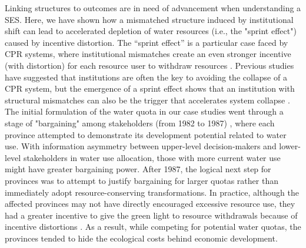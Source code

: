 Linking structures to outcomes are in need of advancement when understanding a SES.
Here, we have shown how a mismatched structure induced by institutional shift can lead to accelerated depletion of water resources (i.e., the "sprint effect") caused by incentive distortion. The ``sprint effect'' is a particular case faced by CPR systems, where institutional mismatches create an even stronger incentive (with distortion) for each resource user to withdraw resources
\cite{ostromRevisitingCommonsLocal1999,ostromGeneralFrameworkAnalyzing2009,castilla-rhoSocialtippingpoints2017}.
Previous studies have suggested that institutions are often the key to avoiding the collapse of a CPR system, but the emergence of a sprint effect shows that an institution with structural mismatches can also be the trigger that accelerates system collapse \cite{bodinConservationSuccessFunction2014,bodinCollaborativeenvironmentalgovernance2017,wangAlignmentsocialecological2019}.
The initial formulation of the water quota in our case studies went through a stage of "bargaining" among stakeholders (from 1982 to 1987) \cite{wangReviewImplementationYellow2019, wangThingsCurrentSignificance2019}, where each province attempted to demonstrate its development potential related to water use.
With information asymmetry between upper-level decision-makers and lower-level stakeholders in water use allocation, those with more current water use might have greater bargaining power. After 1987, the logical next step for provinces was to attempt to justify bargaining for larger quotas rather than immediately adopt resource-conserving transformations. In practice, although the affected provinces may not have directly encouraged excessive resource use, they had a greater incentive to give the green light to resource withdrawals because of incentive distortions \cite{kriegerProgressGroundWater1955, ostromGoverningCommonsEvolution1990}. As a result, while competing for potential water quotas, the provinces tended to hide the ecological costs behind economic development.

